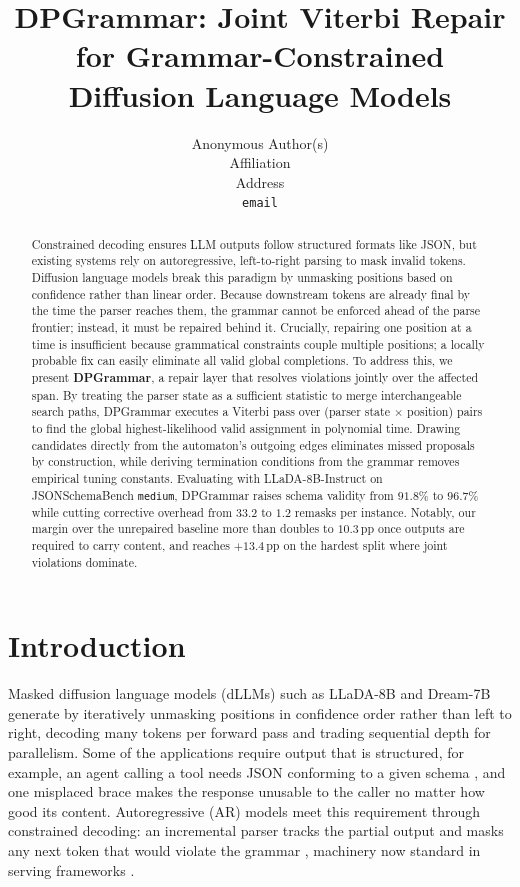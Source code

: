 \documentclass{article}
\title{DPGrammar: Joint Viterbi Repair for Grammar-Constrained\\Diffusion Language Models}
\author{%
  Anonymous Author(s)\\
  Affiliation\\
  Address\\
  \texttt{email}
}
\begin{document}
\maketitle

\begin{abstract}
Constrained decoding ensures LLM outputs follow structured formats like JSON, 
but existing systems rely on autoregressive, left-to-right parsing to mask invalid 
tokens. Diffusion language models break this paradigm by unmasking positions based 
on confidence rather than linear order. Because downstream tokens are already final by 
the time the parser reaches them, the grammar cannot be enforced ahead of the parse frontier; instead, it must be repaired 
behind it. Crucially, repairing one position at a time is insufficient because grammatical 
constraints couple multiple positions; a locally probable fix can easily eliminate 
all valid global completions. To address this, we present \textbf{DPGrammar}, a repair layer 
that resolves violations jointly over the affected span. By treating the parser state as a 
sufficient statistic to merge interchangeable search paths, DPGrammar executes a 
Viterbi pass over (parser state $\times$ position) pairs to find the global highest-likelihood 
valid assignment in polynomial time. Drawing candidates directly from the automaton's 
outgoing edges eliminates missed proposals by construction, while deriving termination 
conditions from the grammar removes empirical tuning constants. Evaluating with LLaDA-8B-Instruct 
on JSONSchemaBench \texttt{medium}, DPGrammar raises schema validity from $91.8\%$ to $96.7\%$ 
while cutting corrective overhead from $33.2$ to $1.2$ remasks per instance. 
Notably, our margin over the unrepaired baseline more than doubles to $10.3$\,pp 
once outputs are required to carry content, and reaches $+13.4$\,pp on the hardest 
split where joint violations dominate.
\end{abstract}

\section{Introduction}

Masked diffusion language models (dLLMs) such as LLaDA-8B \citep{llada} and Dream-7B \citep{dream} generate by iteratively unmasking
positions in confidence order rather than left to right, decoding many tokens
per forward pass and trading sequential depth for parallelism. Some of the applications require
output that is structured, for example, an agent calling a tool needs JSON conforming to a given schema
\citep{patil2025bfcl,geng2025jsonschemabenchrigorousbenchmarkstructured}, and one
misplaced brace makes the response unusable to the caller no matter how good its
content. Autoregressive (AR) models meet this requirement through constrained
decoding: an incremental parser tracks the partial output and masks any next
token that would violate the grammar \citep{outlines}, machinery now standard in
serving frameworks \citep{dong2024xgrammar,guidance,zheng2024sglang,microsoft2025llguidance}.
\end{document}
